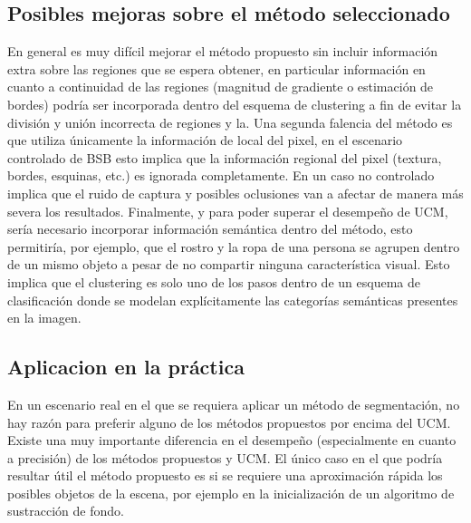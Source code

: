 \documentclass[10pt,twocolumn,letterpaper]{article}
\begin{document}
\subsection{Posibles mejoras sobre el método seleccionado}
En general es muy difícil mejorar el método propuesto sin incluir información extra sobre las regiones que se espera obtener, en particular información en cuanto a continuidad de las regiones (magnitud de gradiente o estimación de bordes) podría ser incorporada dentro del esquema de clustering a fin de evitar la división y unión incorrecta de regiones y la.
Una segunda falencia del método es que utiliza únicamente la información de local del pixel, en el escenario controlado de BSB esto implica que la información regional del pixel (textura, bordes, esquinas, etc.) es ignorada completamente. En un caso no controlado implica que el ruido de captura y posibles oclusiones van a afectar de manera más severa los resultados.
Finalmente, y para poder superar el desempeño de UCM, sería necesario incorporar información semántica dentro del método, esto permitiría, por ejemplo, que  el rostro y la ropa de una persona se agrupen dentro de un mismo objeto a pesar de no compartir ninguna característica visual. Esto implica que el clustering es solo uno de los pasos dentro de un esquema de clasificación donde se modelan explícitamente las categorías semánticas presentes en la imagen.


\subsection{Aplicacion en la práctica}
En un escenario real en el que se requiera aplicar un método de segmentación, no hay razón para preferir alguno de los métodos propuestos por encima del UCM. Existe una muy importante diferencia en el desempeño (especialmente en cuanto a precisión) de los métodos propuestos y UCM. El único caso en el que podría resultar útil el método propuesto es si se requiere una aproximación rápida los posibles objetos de la escena, por ejemplo en la inicialización de un algoritmo de sustracción de fondo.


{\small


}
\end{document}
